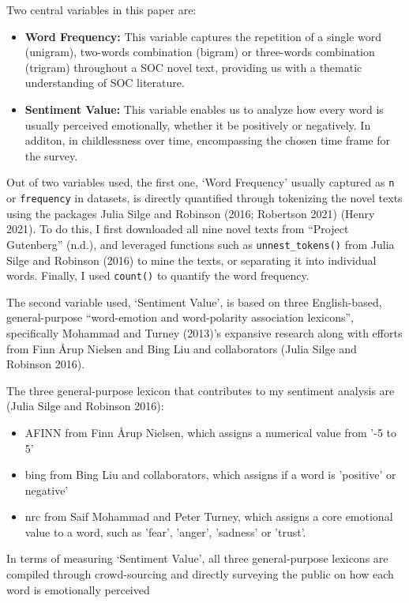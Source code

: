 \documentclass[
  letterpaper,
  DIV=11,
  numbers=noendperiod]{scrartcl}
\providecommand{\tightlist}{%
  \setlength{\itemsep}{0pt}\setlength{\parskip}{0pt}}\usepackage{longtable,booktabs,array}
\begin{document}
Two central variables in this paper are:

\begin{itemize}
\tightlist
\item
  \textbf{Word Frequency:} This variable captures the repetition of a
  single word (unigram), two-words combination (bigram) or three-words
  combination (trigram) throughout a SOC novel text, providing us with a
  thematic understanding of SOC literature.
\item
  \textbf{Sentiment Value:} This variable enables us to analyze how
  every word is usually perceived emotionally, whether it be positively
  or negatively. In additon, in childlessness over time, encompassing
  the chosen time frame for the survey.
\end{itemize}

Out of two variables used, the first one, `Word Frequency' usually
captured as \texttt{n} or \texttt{frequency} in datasets, is directly
quantified through tokenizing the novel texts using the packages Julia
Silge and Robinson (2016; Robertson 2021) (Henry 2021). To do this, I
first downloaded all nine novel texts from {``Project Gutenberg''}
(n.d.), and leveraged functions such as \texttt{unnest\_tokens()} from
Julia Silge and Robinson (2016) to mine the texts, or separating it into
individual words. Finally, I used \texttt{count()} to quantify the word
frequency.

The second variable used, `Sentiment Value', is based on three
English-based, general-purpose ``word-emotion and word-polarity
association lexicons'', specifically Mohammad and Turney (2013)'s
expansive research along with efforts from Finn Årup Nielsen and Bing
Liu and collaborators (Julia Silge and Robinson 2016).

The three general-purpose lexicon that contributes to my sentiment
analysis are (Julia Silge and Robinson 2016):

\begin{itemize}[label={$\square$}]
    \item AFINN from Finn Årup Nielsen, which assigns a numerical value from '-5 to 5' 
    \item bing from Bing Liu and collaborators, which assigns if a word is 'positive' or negative'
    \item nrc from Saif Mohammad and Peter Turney, which assigns a core emotional value to a word, such as 'fear', 'anger', 'sadness' or 'trust'.
\end{itemize}

In terms of measuring `Sentiment Value', all three general-purpose
lexicons are compiled through crowd-sourcing and directly surveying the
public on how each word is emotionally perceived
\end{document}

